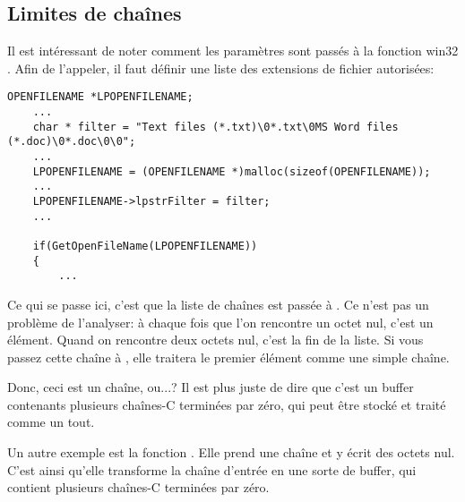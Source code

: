 \subsection{Limites de chaînes}

Il est intéressant de noter comment les paramètres sont passés à la fonction win32
. Afin de l'appeler, il faut définir une liste des extensions
de fichier autorisées:

\begin{lstlisting}[style=customc]
	OPENFILENAME *LPOPENFILENAME;
	...
	char * filter = "Text files (*.txt)\0*.txt\0MS Word files (*.doc)\0*.doc\0\0";
	...
	LPOPENFILENAME = (OPENFILENAME *)malloc(sizeof(OPENFILENAME));
	...
	LPOPENFILENAME->lpstrFilter = filter;
	...

	if(GetOpenFileName(LPOPENFILENAME))
	{
		...
\end{lstlisting}

Ce qui se passe ici, c'est que la liste de chaînes est passée à .
Ce n'est pas un problème de l'analyser: à chaque fois que l'on rencontre un octet
nul, c'est un élément.
Quand on rencontre deux octets nul, c'est la fin de la liste.
Si vous passez cette chaîne à \printf, elle traitera le premier élément comme une
simple chaîne.

Donc, ceci est un chaîne, ou...?
Il est plus juste de dire que c'est un buffer contenants plusieurs chaînes-C terminées
par zéro, qui peut être stocké et traité comme un tout.

Un autre exemple est la fonction . Elle prend une chaîne et y écrit
des octets nul.
C'est ainsi qu'elle transforme la chaîne d'entrée en une sorte de buffer, qui contient
plusieurs chaînes-C terminées par zéro.

